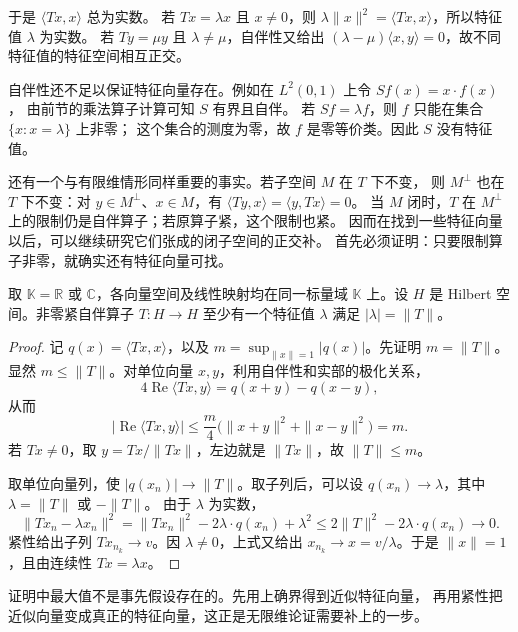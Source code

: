 于是 \(\langle Tx,x\rangle\) 总为实数。
若 \(Tx=\lambda x\) 且 \(x\ne0\)，则
\(\lambda\|x\|^2=\langle Tx,x\rangle\)，所以特征值 \(\lambda\) 为实数。
若 \(Ty=\mu y\) 且 \(\lambda\ne\mu\)，自伴性又给出%
\((\lambda-\mu)\langle x,y\rangle=0\)，故不同特征值的特征空间相互正交。

\ProseParagraphBreak

自伴性还不足以保证特征向量存在。例如在 \(L^2(0,1)\) 上令 \(Sf(x)=x\cdot f(x)\)，
由前节的乘法算子计算可知 \(S\) 有界且自伴。
若 \(Sf=\lambda f\)，则 \(f\) 只能在集合 \(\{x:x=\lambda\}\) 上非零；
这个集合的测度为零，故 \(f\) 是零等价类。因此 \(S\) 没有特征值。

\ProseParagraphBreak

还有一个与有限维情形同样重要的事实。若子空间 \(M\) 在 \(T\) 下不变，
则 \(M^\perp\) 也在 \(T\) 下不变：对 \(y\in M^\perp\)、\(x\in M\)，有%
\(\langle Ty,x\rangle=\langle y,Tx\rangle=0\)。
当 \(M\) 闭时，\(T\) 在 \(M^\perp\) 上的限制仍是自伴算子；若原算子紧，这个限制也紧。
因而在找到一些特征向量以后，可以继续研究它们张成的闭子空间的正交补。
首先必须证明：只要限制算子非零，就确实还有特征向量可找。

\begin{lemma}[模最大的特征值]
\label{b1:lem:compact-self-adjoint-extreme}
取 \(\mathbb K=\mathbb R\) 或 \(\mathbb C\)，各向量空间及线性映射均在同一标量域 \(\mathbb K\) 上。设 \(H\) 是 Hilbert 空间。非零紧自伴算子 \(T:H\to H\) 至少有一个特征值 \(\lambda\) 满足%
\(|\lambda|=\|T\|\)。
\end{lemma}

\begin{proof}
记 \(q(x)=\langle Tx,x\rangle\)，以及%
\(m=\sup_{\|x\|=1}|q(x)|\)。先证明 \(m=\|T\|\)。
显然 \(m\leq\|T\|\)。对单位向量 \(x,y\)，利用自伴性和实部的极化关系，
\[
 4\operatorname{Re}\langle Tx,y\rangle=q(x+y)-q(x-y),
\]
从而
\[
 |\operatorname{Re}\langle Tx,y\rangle|
 \leq \frac m4\bigl(\|x+y\|^2+\|x-y\|^2\bigr)=m.
\]
若 \(Tx\ne0\)，取 \(y=Tx/\|Tx\|\)，左边就是 \(\|Tx\|\)，故 \(\|T\|\leq m\)。

取单位向量列，使 \(|q(x_n)|\to\|T\|\)。取子列后，可以设%
\(q(x_n)\to\lambda\)，其中 \(\lambda=\|T\|\) 或 \(-\|T\|\)。
由于 \(\lambda\) 为实数，
\[
 \|Tx_n-\lambda x_n\|^2
 =\|Tx_n\|^2-2\lambda\cdot q(x_n)+\lambda^2
 \leq2\|T\|^2-2\lambda\cdot q(x_n)\longrightarrow0.
\]
紧性给出子列 \(Tx_{n_k}\to v\)。因 \(\lambda\ne0\)，上式又给出%
\(x_{n_k}\to x=v/\lambda\)。于是 \(\|x\|=1\)，且由连续性 \(Tx=\lambda x\)。
\end{proof}

证明中最大值不是事先假设存在的。先用上确界得到近似特征向量，
再用紧性把近似向量变成真正的特征向量，这正是无限维论证需要补上的一步。

